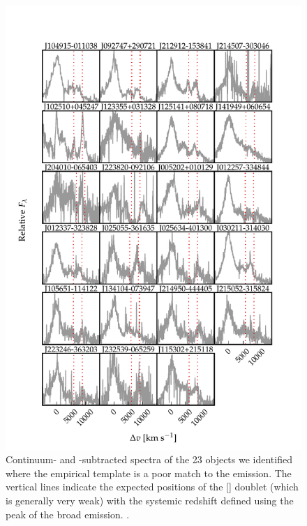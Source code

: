 \begin{figure}
    \centering
    \includegraphics[width=\columnwidth]{figures/chapter04/example_spectrum_grid_extreme_fe.pdf} 
    \caption{Continuum- and -subtracted spectra of the 23 objects we identified where the \citet{boroson92} empirical template is a poor match to the  emission. The vertical lines indicate the expected positions of the [] doublet (which is generally very weak) with the systemic redshift defined using the peak of the broad \hb emission. .}     
    \label{fig:bad_fe}
\end{figure}

